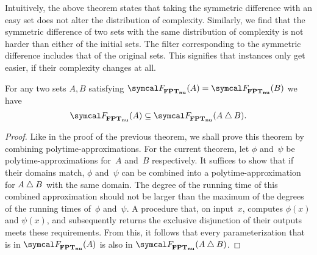 Intuitively, the above theorem states that taking the symmetric difference with an easy set does not alter the distribution of complexity.
Similarly, we find that the symmetric difference of two sets with the same distribution of complexity is not harder than either of the initial sets.
The filter corresponding to the symmetric difference includes that of the original sets.
This signifies that instances only get easier, if their complexity changes at all.
\begin{theorem}
\label{thm:nufptsymdiffsubeq}%
  For any two sets $A, B$ satisfying $\calF_\clnu{FPT}(A) = \calF_\clnu{FPT}(B)$ we have
  \begin{equation*}
    \calF_\clnu{FPT}(A) \subseteq \calF_\clnu{FPT}(A \symdiff B).
  \end{equation*}
\end{theorem}
\begin{proof}
  Like in the proof of the previous theorem, we shall prove this theorem by combining polytime-approximations.
  For the current theorem, let $\phi$ and~$\psi$ be polytime-approximations for~$A$ and~$B$ respectively.
  It suffices to show that if their domains match, $\phi$ and~$\psi$ can be combined into a polytime-approximation for $A \bigtriangleup B$ with the same domain.
  The degree of the running time of this combined approximation should not be larger than the maximum of the degrees of the running times of~$\phi$ and~$\psi$.
  A procedure that, on input~$x$, computes $\phi(x)$ and $\psi(x)$, and subsequently returns the exclusive disjunction of their outputs meets these requirements.
  From this, it follows that every parameterization that is in $\calF_\clnu{FPT}(A)$ is also in $\calF_\clnu{FPT}(A \symdiff B)$.
\end{proof}

